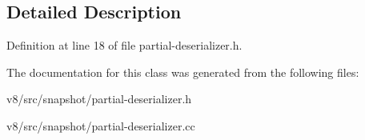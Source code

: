 \subsection{Detailed Description}


Definition at line 18 of file partial-\/deserializer.\+h.



The documentation for this class was generated from the following files\+:\begin{DoxyCompactItemize}
\item 
v8/src/snapshot/partial-\/deserializer.\+h\item 
v8/src/snapshot/partial-\/deserializer.\+cc\end{DoxyCompactItemize}
